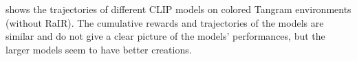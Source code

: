  shows the trajectories of different CLIP models on colored Tangram environments (without RaIR).
The cumulative rewards and trajectories of the models are similar and do not give a clear picture of the models' performances, but the larger models seem to have better creations. 


